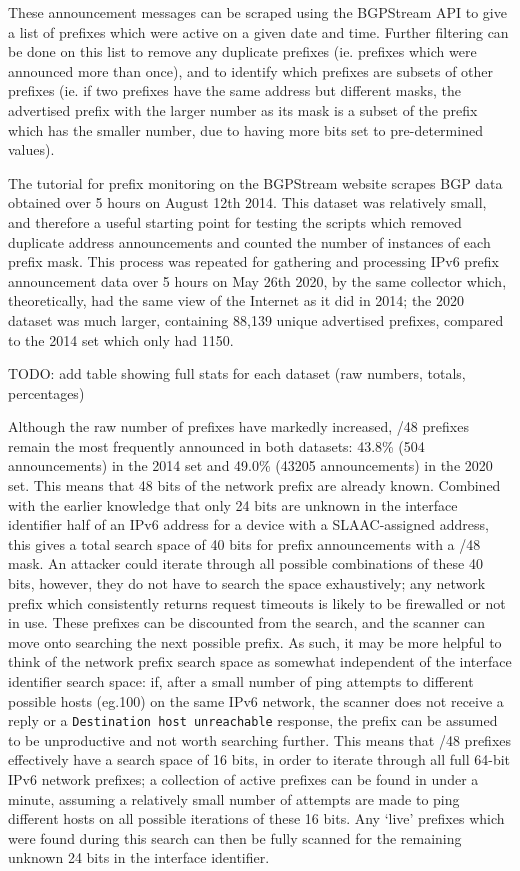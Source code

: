 \documentclass[10pt,sigconf]{acmart}
\begin{document}
These announcement messages can be scraped using the BGPStream API to give a list of prefixes which were active on a given date and time.
Further filtering can be done on this list to remove any duplicate prefixes (ie. prefixes which were announced more than once), and to identify which prefixes are subsets of other prefixes
(ie. if two prefixes have the same address but different masks, the advertised prefix with the larger number as its mask is a subset of the prefix which has the smaller number, due to having more bits set to pre-determined values).

The tutorial for prefix monitoring on the BGPStream website scrapes BGP data obtained over 5 hours on August 12th 2014.
This dataset was relatively small, and therefore a useful starting point for testing the scripts which removed duplicate address announcements and counted the number of instances of each prefix mask.
This process was repeated for gathering and processing IPv6 prefix announcement data over 5 hours on May 26th 2020, by the same collector which, theoretically, had the same view of the Internet as it did in 2014;
the 2020 dataset was much larger, containing 88,139 unique advertised prefixes, compared to the 2014 set which only had 1150.

TODO: add table showing full stats for each dataset (raw numbers, totals, percentages)

Although the raw number of prefixes have markedly increased, /48 prefixes remain the most frequently announced in both datasets:
43.8\% (504 announcements) in the 2014 set and 49.0\% (43205 announcements) in the 2020 set.
This means that 48 bits of the network prefix are already known.
Combined with the earlier knowledge that only 24 bits are unknown in the interface identifier half of an IPv6 address for a device with a SLAAC-assigned address, this gives a total search space of 40 bits for prefix announcements with a /48 mask.
An attacker could iterate through all possible combinations of these 40 bits, however, they do not have to search the space exhaustively;
any network prefix which consistently returns request timeouts is likely to be firewalled or not in use.
These prefixes can be discounted from the search, and the scanner can move onto searching the next possible prefix.
As such, it may be more helpful to think of the network prefix search space as somewhat independent of the interface identifier search space:
if, after a small number of ping attempts to different possible hosts (eg.100) on the same IPv6 network, the scanner does not receive a reply or a \texttt{Destination host unreachable} response, the prefix can be assumed to be unproductive and not worth searching further.
This means that /48 prefixes effectively have a search space of 16 bits, in order to iterate through all full 64-bit IPv6 network prefixes;
a collection of active prefixes can be found in under a minute, assuming a relatively small number of attempts are made to ping different hosts on all possible iterations of these 16 bits.
Any `live' prefixes which were found during this search can then be fully scanned for the remaining unknown 24 bits in the interface identifier.
\end{document}
